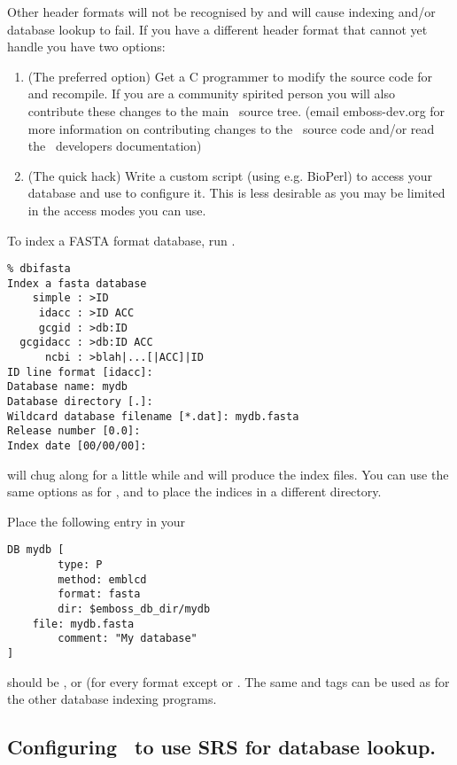 \documentclass{report}
\begin{document}
Other header formats will not be recognised by  and will cause indexing and/or database lookup to fail. If you have a different header format that  cannot yet handle you have two options:
\begin{enumerate}
\item (The preferred option) Get a C programmer to modify the source code for  and recompile. If you are a community spirited person you will also contribute these changes to the main \EMBOSS\ source tree. (email emboss-dev\@@embnet.org for more information on contributing changes to the \EMBOSS\ source code and/or read the \EMBOSS\ developers documentation)
\item (The quick hack) Write a custom script (using e.g. BioPerl) to access your database and use  to configure it. This is less desirable as you may be limited in the access modes you can use.
\end{enumerate}

To index a FASTA format database, run .
\begin{verbatim}
% dbifasta
Index a fasta database
    simple : >ID
     idacc : >ID ACC
     gcgid : >db:ID
  gcgidacc : >db:ID ACC
      ncbi : >blah|...[|ACC]|ID
ID line format [idacc]: 
Database name: mydb
Database directory [.]: 
Wildcard database filename [*.dat]: mydb.fasta
Release number [0.0]: 
Index date [00/00/00]: 
\end{verbatim}

 will chug along for a little while and will produce the index files. You can use the same  options as for , and   to place the indices in a different directory.

Place the following entry in your 

\begin{verbatim}
DB mydb [
        type: P
        method: emblcd
        format: fasta
        dir: $emboss_db_dir/mydb
	file: mydb.fasta
        comment: "My database"
]
\end{verbatim}

 should be ,  or  (for every format except  or . The same  and  tags can be used as for the other database indexing programs.


\subsection{Configuring \EMBOSS\ to use SRS for database lookup.}
\end{document}
